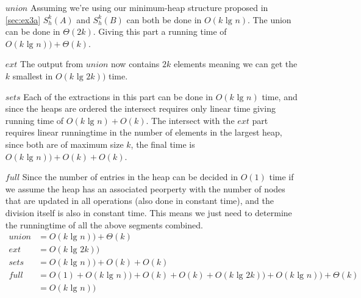\begin{itemize}
\item[$union$] Assuming we're using our minimum-heap structure proposed in
  \ref{sec:ex3a} $S^{k}_{h}(A)$ and $S^{k}_{h}(B)$ can both be done in $O(k
  \text{ lg } n)$. The union can be done in $\Theta(2k)$. Giving this part a
  running time of $O(k \text{ lg } n)) + \Theta(k)$.
%
\item[$ext$] The output from $union$ now contains $2k$ elements meaning we can
  get the $k$ smallest in $O(k \text{ lg } 2k))$ time.
%
\item[$sets$] Each of the extractions in this part can be done in $O(k \text{ lg
  } n)$ time, and since the heaps are ordered the intersect requires only linear
  time giving running time of $O(k \text{ lg } n) + O(k)$. The intersect with
  the $ext$ part requires linear runningtime in the number of elements in the
  largest heap, since both are of maximum size $k$, the final time is $O(k
  \text{ lg } n)) + O(k) + O(k)$.
%
\item[$full$] Since the number of entries in the heap can be decided in $O(1)$
  time if we assume the heap has an associated peorperty with the number of
  nodes that are updated in all operations (also done in constant time), and the
  division itself is also in constant time. This means we just need to determine
  the runningtime of all the above segments combined.
\begin{align*}
  union &= O(k \text{ lg } n)) + \Theta(k) \\
  ext   &= O(k \text{ lg } 2k)) \\
  sets  &= O(k \text{ lg } n)) + O(k) + O(k) \\
  full  &= O(1) + O(k \text{ lg } n)) + O(k) + O(k) + O(k \text{ lg } 2k)) + O(k \text{ lg } n)) + \Theta(k) \\
        &= O(k \text{ lg } n))
\end{align*}
\end{itemize}